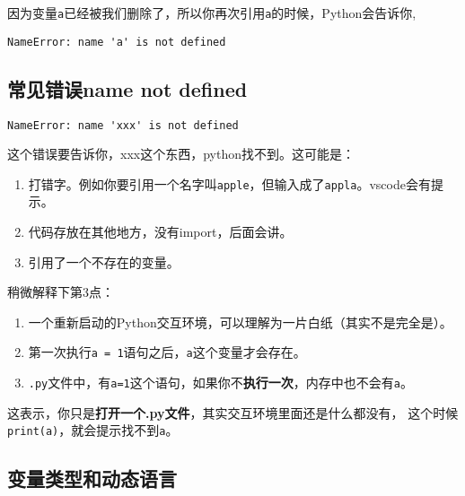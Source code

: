 \documentclass[
  letterpaper,
  DIV=11,
  numbers=noendperiod]{scrreprt}
\providecommand{\tightlist}{%
  \setlength{\itemsep}{0pt}\setlength{\parskip}{0pt}}\usepackage{longtable,booktabs,array}
\begin{document}
因为变量\texttt{a}已经被我们删除了，所以你再次引用\texttt{a}的时候，Python会告诉你,

\begin{verbatim}
NameError: name 'a' is not defined
\end{verbatim}

\hypertarget{ux5e38ux89c1ux9519ux8befname-not-defined}{%
\subsection{常见错误name not
defined}\label{ux5e38ux89c1ux9519ux8befname-not-defined}}

\begin{verbatim}
NameError: name 'xxx' is not defined
\end{verbatim}

这个错误要告诉你，xxx这个东西，python找不到。这可能是：

\begin{enumerate}
\def\labelenumi{\arabic{enumi}.}
\tightlist
\item
  打错字。例如你要引用一个名字叫\texttt{apple}，但输入成了\texttt{appla}。vscode会有提示。
\item
  代码存放在其他地方，没有import，后面会讲。
\item
  引用了一个不存在的变量。
\end{enumerate}

稍微解释下第3点：

\begin{enumerate}
\def\labelenumi{\arabic{enumi}.}
\tightlist
\item
  一个重新启动的Python交互环境，可以理解为一片白纸（其实不是完全是）。
\item
  第一次执行\texttt{a\ =\ 1}语句之后，\texttt{a}这个变量才会存在。
\item
  \texttt{.py}文件中，有\texttt{a=1}这个语句，如果你不\textbf{执行一次}，内存中也不会有\texttt{a}。
\end{enumerate}

这表示，你只是\textbf{打开一个.py文件}，其实交互环境里面还是什么都没有，
这个时候\texttt{print(a)}，就会提示找不到\texttt{a}。

\hypertarget{ux53d8ux91cfux7c7bux578bux548cux52a8ux6001ux8bedux8a00}{%
\subsection{变量类型和动态语言}\label{ux53d8ux91cfux7c7bux578bux548cux52a8ux6001ux8bedux8a00}}
\end{document}
